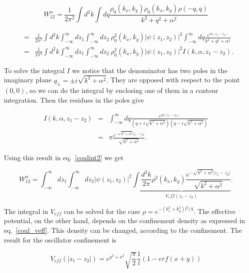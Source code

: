 \documentclass[a4paper,10pt]{article}
\begin{document}
\begin{equation}
W^{\alpha}_{12}= \frac{1}{2\pi^2}\int d^2k \int dq
\frac{\rho_0(k_x,k_y)\rho_0(k_x,k_y)\rho(-q,q) }{k^2 + q^2 + \alpha^2}
\end{equation}

\begin{eqnarray}
&=& \frac{1}{2\pi^2}\int d^2k \int^\infty_{-\infty} dz_1 \int^\infty_{-\infty} dz_2
\ \rho^2_0(k_x,k_y)|\psi(z_1,z_2)|^2 \int^\infty_{-\infty} dq
\frac{e^{iq(z_1-z_2)}}{k^2 + q^2 + \alpha^2} \nonumber\\
&=& \frac{1}{2\pi^2}\int d^2k \int^\infty_{-\infty} dz_1 \int^\infty_{-\infty} dz_2
\ \rho^2_0(k_x,k_y)|\psi(z_1,z_2)|^2 I(k,\alpha , z_1-z_2).\label{coulint2}
\end{eqnarray}

To solve the integral $I$ we notice that the denominator has two poles in the imaginary
plane $q_{\pm}=\pm i \sqrt{k^2+\alpha^2}$. They are opposed with respect to the point
$(0,0)$, so we can do the integral by enclosing one of them in a contour integration.
Then the residues in the poles give

\begin{eqnarray}
I(k,\alpha,z_1-z_2) &=& \int^\infty_{-\infty} dq \frac{e^{iq(z_1-z_2)}}{(q+i\sqrt{k^2+\alpha^2})(q-i\sqrt{k^2+\alpha^2})} \\
&=& \pi \frac{e^{-\sqrt{k^2+\alpha^2}|z_1-z_2|}}{\sqrt{k^2+\alpha^2}}.
\end{eqnarray}

Using this result in eq.~\ref{coulint2} we get

\begin{equation}\label{coul_veff}
W^{\alpha}_{12}=\int^\infty_{-\infty} dz_1 \int^\infty_{-\infty} dz_2 |\psi(z_1,z_2)|^2
\underbrace{\int \frac{d^2k}{2\pi} \rho^2(k_x,k_y) \frac{e^{-\sqrt{k^2+\alpha^2}|z_1
-z_2|}}{\sqrt{k^2+\alpha^2}}}_{V_eff(z_1-z_2)}.
\end{equation}

The integral in $V_{eff}$ can be solved for the case $\rho=e^{-(k_x^2+k^2_y)l^2/4}$. The
effective potential, on the other hand, depends on the confinement density as expressed
in eq.~\ref{coul_veff}. This density can be changed, according to the confinement. The
result for the oscillator confinement is

\begin{equation}
\label{V_eff}
V_{eff}(|z_1-z_2|)= e^{y^2+x^2}\sqrt{\frac{\pi}{2}}\frac{1}{l}\left(1-erf(x+y)\right)
\end{equation}
\end{document}
